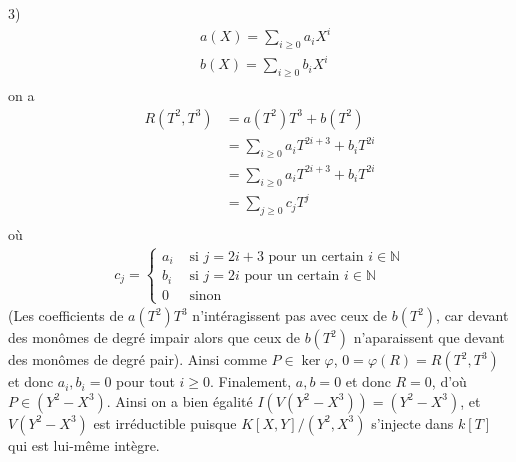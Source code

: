 \begin{question}{3)}
            \begin{align*}
                &a(X) = \sum_{i \geq 0} a_i X^i \\
                &b(X) = \sum_{i \geq 0} b_i X^i \\
            \end{align*}
            on a 
            \begin{align*}
                R(T^2, T^3) &= a(T^2)T^3 + b(T^2) \\
                &= \sum_{i \geq 0} a_i T^{2i + 3} + b_i T^{2i} \\
                &= \sum_{i \geq 0} a_i T^{2i + 3} + b_i T^{2i} \\
                &= \sum_{j \geq 0} c_j T^j \\
            \end{align*}
            où
            \begin{align*}
                c_j =
                \begin{cases}
                    a_i &\text{ si } j = 2i + 3 \text{ pour un certain } i \in \mathbb{N} \\
                    b_i &\text{ si } j = 2i \text{ pour un certain } i \in \mathbb{N} \\
                    0 & \text{ sinon}
                \end{cases}
            \end{align*}
            (Les coefficients de $a(T^2)T^3$ n'intéragissent pas avec ceux de $b(T^2)$, car devant des monômes de degré impair alors que ceux de $b(T^2)$ n'aparaissent que devant des monômes de degré pair). Ainsi comme $P \in \ker \varphi$, $0 = \varphi(R) = R(T^2, T^3)$ et donc $a_i, b_i = 0$ pour tout $i \geq 0$. Finalement, $a,b = 0$ et donc $R = 0$, d'où $P \in (Y^2 - X^3)$. Ainsi on a bien égalité $I(V(Y^2 - X^3)) = (Y^2 - X^3)$, et $V(Y^2 - X^3)$ est irréductible puisque $K[X,Y]/(Y^2 , X^3)$ s'injecte dans $k[T]$ qui est lui-même intègre.
        \end{question}

